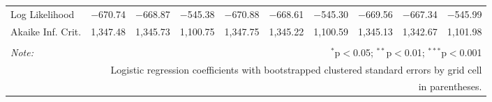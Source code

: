 \begin{table}[!htbp]
\begin{tabular}{@{\extracolsep{-6pt}}lccccccccc}
Log Likelihood & $-$670.74 & $-$668.87 & $-$545.38 & $-$670.88 & $-$668.61 & $-$545.30 & $-$669.56 & $-$667.34 & $-$545.99 \\ 
Akaike Inf. Crit. & 1,347.48 & 1,345.73 & 1,100.75 & 1,347.75 & 1,345.22 & 1,100.59 & 1,345.13 & 1,342.67 & 1,101.98 \\ 
\hline 
\hline \\[-1.8ex] 
\textit{Note:}  & \multicolumn{9}{r}{$^{*}$p$<$0.05; $^{**}$p$<$0.01; $^{***}$p$<$0.001} \\ 
 & \multicolumn{9}{r}{Logistic regression coefficients with bootstrapped clustered standard errors by grid cell} \\ 
 & \multicolumn{9}{r}{ in parentheses.} \\ 
\end{tabular} 
\end{table} 
